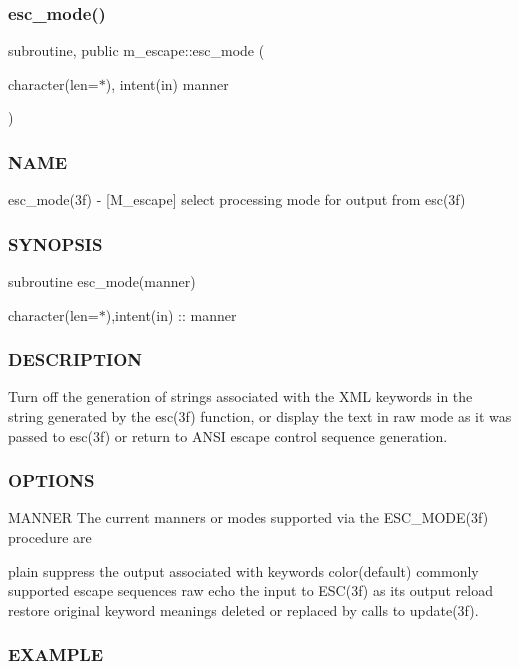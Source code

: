 \subsubsection{\texorpdfstring{esc\+\_\+mode()}{esc\_mode()}}
{\footnotesize\ttfamily subroutine, public m\+\_\+escape\+::esc\+\_\+mode (\begin{DoxyParamCaption}\item[{character(len=$\ast$), intent(in)}]{manner }\end{DoxyParamCaption})}



\subsubsection*{N\+A\+ME}

esc\+\_\+mode(3f) -\/ \mbox{[}M\+\_\+escape\mbox{]} select processing mode for output from esc(3f) \subsubsection*{S\+Y\+N\+O\+P\+S\+IS}

subroutine esc\+\_\+mode(manner)

character(len=$\ast$),intent(in) \+:\+: manner \subsubsection*{D\+E\+S\+C\+R\+I\+P\+T\+I\+ON}

Turn off the generation of strings associated with the X\+ML keywords in the string generated by the esc(3f) function, or display the text in raw mode as it was passed to esc(3f) or return to A\+N\+SI escape control sequence generation.

\subsubsection*{O\+P\+T\+I\+O\+NS}

M\+A\+N\+N\+ER The current manners or modes supported via the E\+S\+C\+\_\+\+M\+O\+D\+E(3f) procedure are

plain suppress the output associated with keywords color(default) commonly supported escape sequences raw echo the input to E\+S\+C(3f) as its output reload restore original keyword meanings deleted or replaced by calls to update(3f).

\subsubsection*{E\+X\+A\+M\+P\+LE}

